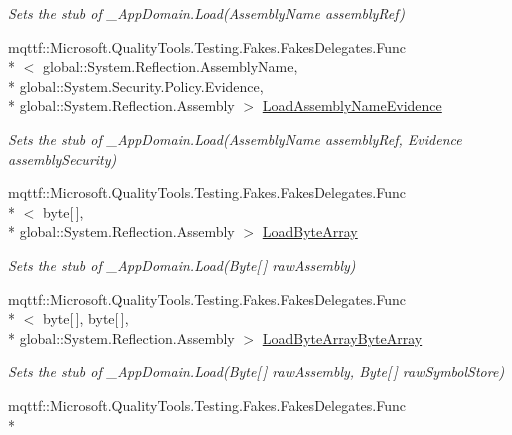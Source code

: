 \begin{DoxyCompactItemize}
\begin{DoxyCompactList}\small\item\em Sets the stub of \-\_\-\-App\-Domain.\-Load(\-Assembly\-Name assembly\-Ref)\end{DoxyCompactList}\item 
mqttf\-::\-Microsoft.\-Quality\-Tools.\-Testing.\-Fakes.\-Fakes\-Delegates.\-Func\\*
$<$ global\-::\-System.\-Reflection.\-Assembly\-Name, \\*
global\-::\-System.\-Security.\-Policy.\-Evidence, \\*
global\-::\-System.\-Reflection.\-Assembly $>$ \hyperlink{class_system_1_1_fakes_1_1_stub___app_domain_a2540341ef26c1e2692afd68502f05a7b}{Load\-Assembly\-Name\-Evidence}
\begin{DoxyCompactList}\small\item\em Sets the stub of \-\_\-\-App\-Domain.\-Load(\-Assembly\-Name assembly\-Ref, Evidence assembly\-Security)\end{DoxyCompactList}\item 
mqttf\-::\-Microsoft.\-Quality\-Tools.\-Testing.\-Fakes.\-Fakes\-Delegates.\-Func\\*
$<$ byte\mbox{[}$\,$\mbox{]}, \\*
global\-::\-System.\-Reflection.\-Assembly $>$ \hyperlink{class_system_1_1_fakes_1_1_stub___app_domain_a79b5e3e1543875482277bdd4ee0cba0b}{Load\-Byte\-Array}
\begin{DoxyCompactList}\small\item\em Sets the stub of \-\_\-\-App\-Domain.\-Load(\-Byte\mbox{[}$\,$\mbox{]} raw\-Assembly)\end{DoxyCompactList}\item 
mqttf\-::\-Microsoft.\-Quality\-Tools.\-Testing.\-Fakes.\-Fakes\-Delegates.\-Func\\*
$<$ byte\mbox{[}$\,$\mbox{]}, byte\mbox{[}$\,$\mbox{]}, \\*
global\-::\-System.\-Reflection.\-Assembly $>$ \hyperlink{class_system_1_1_fakes_1_1_stub___app_domain_aeb6abbcfa938525c034468f5ac5af1b2}{Load\-Byte\-Array\-Byte\-Array}
\begin{DoxyCompactList}\small\item\em Sets the stub of \-\_\-\-App\-Domain.\-Load(\-Byte\mbox{[}$\,$\mbox{]} raw\-Assembly, Byte\mbox{[}$\,$\mbox{]} raw\-Symbol\-Store)\end{DoxyCompactList}\item 
mqttf\-::\-Microsoft.\-Quality\-Tools.\-Testing.\-Fakes.\-Fakes\-Delegates.\-Func\\*

\end{DoxyCompactItemize}
